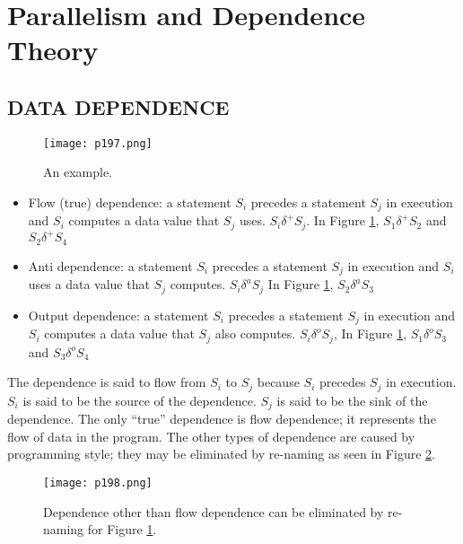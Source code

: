 \newpage


\section{Parallelism and Dependence Theory}

  


\subsection{DATA DEPENDENCE}

\begin{figure}[H]
	\centering
	\texttt{[image: p197.png]}
	\caption{An example.}
	\label{fig:p197}
\end{figure}



    \begin{itemize}
    \item Flow (true) dependence: a statement $S_i$ precedes a
    statement $S_j$ in execution and $S_i$ computes a data value that
    $S_j$ uses. $S_i \delta^{+} S_j$. In Figure \ref{fig:p197}, $S_1 \delta^{+} S_2$ and $S_2 \delta^{+} S_4$

    \item Anti dependence: a statement $S_i$ precedes a statement $S_j$ in
    execution and $S_i$ uses a data value that $S_j$ computes. $S_i \delta^{a} S_j$
    In Figure \ref{fig:p197}, $S_2 \delta^{a} S_3$

    \item Output dependence: a statement $S_i$ precedes a statement $S_j$
    in execution and $S_i$ computes a data value that $S_j$ also
    computes. $S_i \delta^{o} S_j$,
    In Figure \ref{fig:p197}, $S_1 \delta^{o} S_3$ and $S_3 \delta^{o} S_4$
    \end{itemize}


The dependence is said to flow from $S_i$ to $S_j$ because $S_i$
precedes $S_j$ in execution.
$S_i$ is said to be the source of the dependence. $S_j$ is said to
be the sink of the dependence.
The only “true” dependence is flow dependence; it
represents the flow of data in the program.
The other types of dependence are caused by programming
style; they may be eliminated by re-naming as seen in Figure \ref{fig:p198}.


\begin{figure}[H]
	\centering
	\texttt{[image: p198.png]}
	\caption{Dependence other than flow dependence can be eliminated by re-naming for Figure \ref{fig:p197}.}
	\label{fig:p198}
\end{figure}



